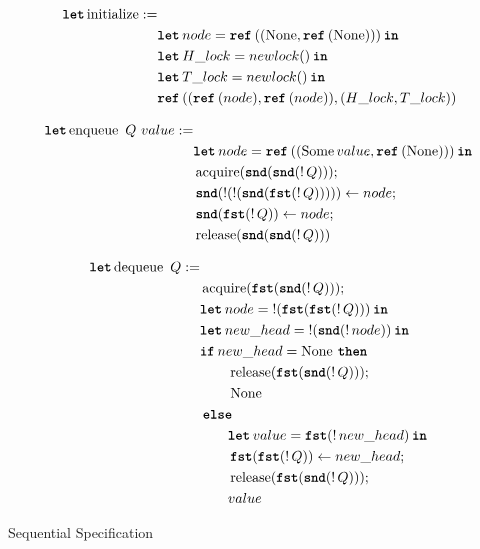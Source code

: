 \documentclass[twoside,11pt,openright]{report}
\newcommand{\acquire}{\operatorname{acquire}}
\newcommand{\release}{\operatorname{release}}
\newcommand{\initialise}{\operatorname{initialize}}
\newcommand{\enqueue}{\operatorname{enqueue}}
\newcommand{\dequeue}{\operatorname{dequeue}}
\begin{document}
\begin{align*}
  \langkw{let} \initialise := &\\
                    & \Let node = \Ref((\None, \Ref(\None))) in\\
                    & \Let H\_lock = newlock \TT in\\
                    & \Let T\_lock = newlock \TT in\\
                    & \Ref ((\Ref(node), \Ref(node)), (H\_lock, T\_lock))
\end{align*}

\begin{align*}
  \langkw{let} \enqueue \ Q \ value :=&\\
		& \Let node = \Ref ((\Some value, \Ref(\None))) in\\
		& \acquire (\Snd (\Snd (\deref Q)));\\
		& \Snd (\deref(\deref(\Snd (\Fst(\deref Q))))) \gets node;\\
		& \Snd (\Fst (\deref Q)) \gets node;\\
		& \release (\Snd (\Snd (\deref Q)))
\end{align*}

\begin{align*}
  \langkw{let} \dequeue \ Q :=&\\ 
		& \acquire (\Fst (\Snd (\deref Q)));\\
		& \Let node = \deref (\Fst (\Fst (\deref Q))) in\\
		& \Let new\_head = \deref (\Snd(\deref node)) in\\
		& \If new\_head = \None then\\
			& \hspace{20pt} \release (\Fst (\Snd(\deref Q)));\\
			& \hspace{20pt} \None\\
		& \Else\\
			& \hspace{20pt} \Let value = \Fst (\deref new\_head) in\\
			& \hspace{20pt} \Fst (\Fst (\deref Q)) \gets new\_head;\\
			& \hspace{20pt} \release (\Fst (\Snd (\deref Q)));\\
      & \hspace{20pt} value
\end{align*}


Sequential Specification
\end{document}
